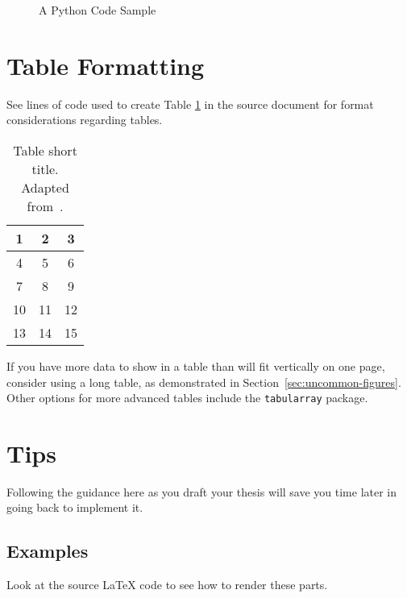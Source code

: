 \begin{figure}[H] %
    \centering
    
    \caption{A Python Code Sample}
    \label{fig:python-short} %
\end{figure}

\section{Table Formatting}\label{section:tableformat}
See lines of code used to create Table \ref{table:sampletab} in the source document for format considerations regarding tables.      
     
\begin{table}[H] %
    \centering
    \caption[Table short title]{Table short title. Adapted from~\citet[table 5]{congress_1991}.} %
    \label{table:sampletab}
    \begin{tabular}{ c c c }
    \hline
      1 & 2 & 3 \\ \hline
      4 & 5 & 6 \\
      7 & 8 & 9 \\
      10 & 11 & 12 \\
      13 & 14 & 15 \\
    \hline
    \end{tabular}
\end{table}

If you have more data to show in a table than will fit vertically on one page, consider using a long table, as demonstrated in Section~\ref{sec:uncommon-figures}.
Other options for more advanced tables include the \texttt{tabularray} package.

\section{Tips}
Following the guidance here as you draft your thesis will save you time later in going back to implement it.

\subsection{Examples}
Look at the source \LaTeX{} code to see how to render these parts.

